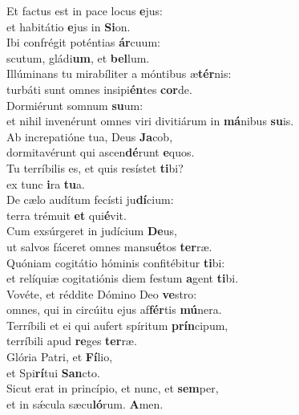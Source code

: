 \evenverse Et factus est in pace locus \textbf{e}jus:~\*\\
\evenverse et habitátio \textbf{e}jus in \textbf{Si}on.\\
\oddverse Ibi confrégit poténtias \textbf{ár}cuum:~\*\\
\oddverse scutum, gládi\textbf{um}, et \textbf{bel}lum.\\
\evenverse Illúminans tu mirabíliter a móntibus æ\textbf{tér}nis:~\*\\
\evenverse turbáti sunt omnes insipi\textbf{én}tes \textbf{cor}de.\\
\oddverse Dormiérunt somnum \textbf{su}um:~\*\\
\oddverse et nihil invenérunt omnes viri divitiárum in \textbf{má}nibus \textbf{su}is.\\
\evenverse Ab increpatióne tua, Deus \textbf{Ja}cob,~\*\\
\evenverse dormitavérunt qui ascen\textbf{dé}runt \textbf{e}quos.\\
\oddverse Tu terríbilis es, et quis resístet \textbf{ti}bi?~\*\\
\oddverse ex tunc \textbf{i}ra \textbf{tu}a.\\
\evenverse De cælo audítum fecísti ju\textbf{dí}cium:~\*\\
\evenverse terra trémuit \textbf{et} qui\textbf{é}vit.\\
\oddverse Cum exsúrgeret in judícium \textbf{De}us,~\*\\
\oddverse ut salvos fáceret omnes mansu\textbf{é}tos \textbf{ter}ræ.\\
\evenverse Quóniam cogitátio hóminis confitébitur \textbf{ti}bi:~\*\\
\evenverse et relíquiæ cogitatiónis diem festum \textbf{a}gent \textbf{ti}bi.\\
\oddverse Vovéte, et réddite Dómino Deo \textbf{ve}stro:~\*\\
\oddverse omnes, qui in circúitu ejus af\textbf{fér}tis \textbf{mú}nera.\\
\evenverse Terríbili et ei qui aufert spíritum \textbf{prín}cipum,~\*\\
\evenverse terríbili apud \textbf{re}ges \textbf{ter}ræ.\\
\oddverse Glória Patri, et \textbf{Fí}lio,~\*\\
\oddverse et Spi\textbf{rí}tui \textbf{San}cto.\\
\evenverse Sicut erat in princípio, et nunc, et \textbf{sem}per,~\*\\
\evenverse et in sǽcula sæcu\textbf{ló}rum. \textbf{A}men.\\
